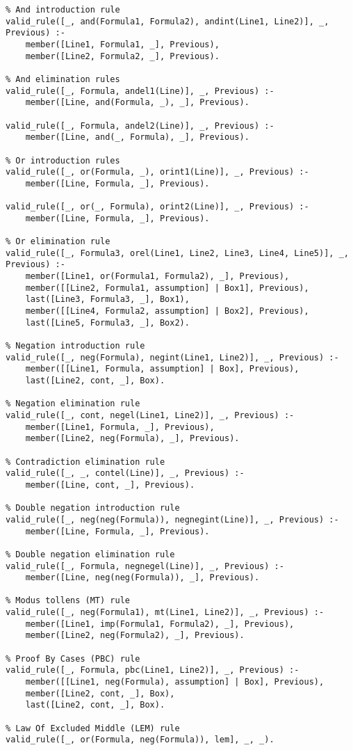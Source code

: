 \documentclass[a4paper,11pt]{article}
\begin{document}
\begin{verbatim}
% And introduction rule
valid_rule([_, and(Formula1, Formula2), andint(Line1, Line2)], _, Previous) :-
    member([Line1, Formula1, _], Previous),
    member([Line2, Formula2, _], Previous).

% And elimination rules
valid_rule([_, Formula, andel1(Line)], _, Previous) :-
    member([Line, and(Formula, _), _], Previous).

valid_rule([_, Formula, andel2(Line)], _, Previous) :-
    member([Line, and(_, Formula), _], Previous).

% Or introduction rules
valid_rule([_, or(Formula, _), orint1(Line)], _, Previous) :-
    member([Line, Formula, _], Previous).

valid_rule([_, or(_, Formula), orint2(Line)], _, Previous) :-
    member([Line, Formula, _], Previous).

% Or elimination rule
valid_rule([_, Formula3, orel(Line1, Line2, Line3, Line4, Line5)], _, Previous) :-
    member([Line1, or(Formula1, Formula2), _], Previous),
    member([[Line2, Formula1, assumption] | Box1], Previous),
    last([Line3, Formula3, _], Box1),
    member([[Line4, Formula2, assumption] | Box2], Previous),
    last([Line5, Formula3, _], Box2).

% Negation introduction rule
valid_rule([_, neg(Formula), negint(Line1, Line2)], _, Previous) :-
    member([[Line1, Formula, assumption] | Box], Previous),
    last([Line2, cont, _], Box).

% Negation elimination rule
valid_rule([_, cont, negel(Line1, Line2)], _, Previous) :-
    member([Line1, Formula, _], Previous),
    member([Line2, neg(Formula), _], Previous).

% Contradiction elimination rule
valid_rule([_, _, contel(Line)], _, Previous) :-
    member([Line, cont, _], Previous).

% Double negation introduction rule
valid_rule([_, neg(neg(Formula)), negnegint(Line)], _, Previous) :-
    member([Line, Formula, _], Previous).

% Double negation elimination rule
valid_rule([_, Formula, negnegel(Line)], _, Previous) :-
    member([Line, neg(neg(Formula)), _], Previous).

% Modus tollens (MT) rule
valid_rule([_, neg(Formula1), mt(Line1, Line2)], _, Previous) :-
    member([Line1, imp(Formula1, Formula2), _], Previous),
    member([Line2, neg(Formula2), _], Previous).

% Proof By Cases (PBC) rule
valid_rule([_, Formula, pbc(Line1, Line2)], _, Previous) :-
    member([[Line1, neg(Formula), assumption] | Box], Previous),
    member([Line2, cont, _], Box),
    last([Line2, cont, _], Box).

% Law Of Excluded Middle (LEM) rule
valid_rule([_, or(Formula, neg(Formula)), lem], _, _).
\end{verbatim}
\end{document}
